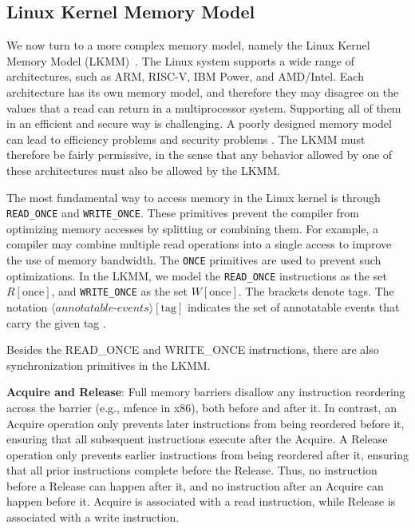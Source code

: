\subsection{Linux Kernel Memory Model}
\label{Background:LKMM}




We now turn to a more complex memory model, namely the Linux Kernel Memory
Model (LKMM)~\citep{alglave2018frightening}. The Linux system supports a wide range of architectures, such as
ARM, RISC-V, IBM Power, and AMD/Intel. Each architecture has its own memory
model, and therefore they may disagree on the values that a read can return in
a multiprocessor system. Supporting all of them in an efficient and secure way
is challenging. A poorly designed memory model can lead to efficiency problems
and security problems \citep{alglave2018frightening}. The LKMM must therefore be
fairly permissive, in the sense that any behavior allowed by one of these
architectures must also be allowed by the LKMM.  

The most fundamental way to access memory in the Linux kernel is through
\texttt{READ\_ONCE} and \texttt{WRITE\_ONCE}. These primitives prevent the
compiler from optimizing memory accesses by splitting or combining them. For
example, a compiler may combine multiple read operations into a single access
to improve the use of memory bandwidth. The \texttt{ONCE} primitives are used
to prevent such optimizations. In the LKMM, we model the \texttt{READ\_ONCE} instructions as the set
$R[\text{once}]$, and \texttt{WRITE\_ONCE} as the set $W[\text{once}]$.
The brackets denote tags. The notation
$\langle annotatable\text{-}events \rangle[\text{tag}]$
indicates the set of annotatable events that carry the given tag
\citep{10.1145/2627752}.

Besides the READ\_ONCE and WRITE\_ONCE instructions, there are also synchronization primitives in the LKMM. 

\textbf{Acquire and Release}: Full memory barriers disallow any instruction
reordering across the barrier (e.g., mfence in x86), both before and after it. In contrast, an
Acquire operation only prevents later instructions from being reordered before
it, ensuring that all subsequent instructions execute after the Acquire. A
Release operation only prevents earlier instructions from being reordered
after it, ensuring that all prior instructions complete before the Release.
Thus, no instruction before a Release can happen after it, and no instruction
after an Acquire can happen before it. Acquire is associated with a read
instruction, while Release is associated with a write instruction.

